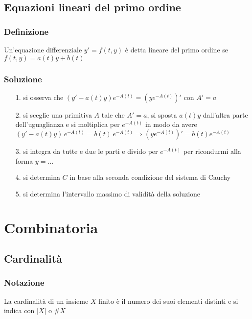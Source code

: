 \documentclass[a4paper]{article}
\begin{document}
\subsection{Equazioni lineari del primo ordine}
\subsubsection*{Definizione}
Un'equazione differenziale \(y' = f(t,y)\) è detta lineare del primo ordine se \(f(t,y) = a(t)y + b(t)\)

\subsubsection*{Soluzione}
\begin{itemize}[topsep=3pt, itemsep=0pt]
	\item[1.] si osserva che \((y'-a(t)y)e^{-A(t)} = (y e^{-A(t)})'\) con \(A' = a\)
	\item[2.] si sceglie una primitiva \(A\) tale che \(A' = a\), si sposta \(a(t)y\) dall'altra parte dell'uguaglianza e si
	moltiplica per \(e^{-A(t)}\) in modo da avere \((y'-a(t)y) \, e^{-A(t)} = b(t) \, e^{-A(t)} \Rightarrow (y e^{-A(t)})' = b(t) e^{-A(t)}\)
	\item[3.] si integra da tutte e due le parti e divido per \(e^{-A(t)}\) per ricondurmi alla forma \(y = \dots\)
	\item[4.] si determina \(C\) in base alla seconda condizione del sistema di Cauchy
	\item[5.] si determina l'intervallo massimo di validità della soluzione
\end{itemize}

\newpage

\section{Combinatoria}
\subsection{Cardinalità}
\subsubsection*{Notazione}
La cardinalità di un insieme \(X\) finito è il numero dei suoi elementi distinti e si indica con \(|X|\) o \(\#X\)
\end{document}
